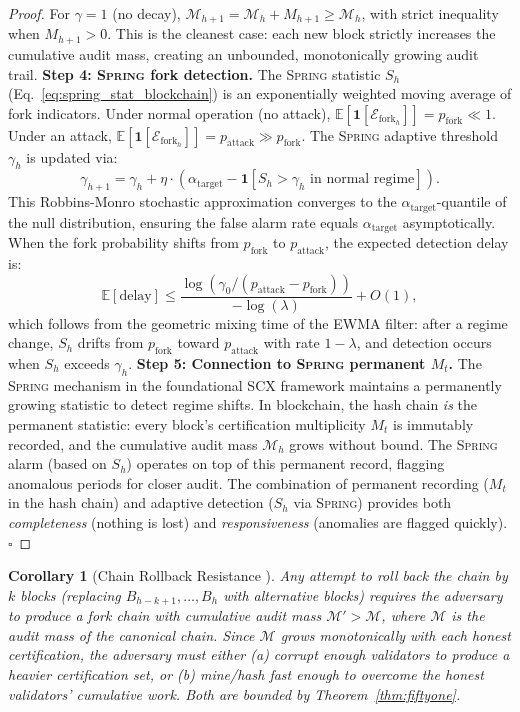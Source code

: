 \documentclass[11pt,a4paper]{article}
\newtheorem{corollary}[theorem]{Corollary}
\theoremstyle{definition}
\newcommand{\Spring}{\textsc{Spring}}
\newcommand{\SCX}{\textsc{SCX}}
\newcommand{\E}{\mathbb{E}}
\newcommand{\ind}[1]{\mathbf{1}[#1]}
\newcommand{\forkEvent}{\mathcal{E}_{\mathrm{fork}}}
\begin{document}
\begin{proof}
For $\gamma = 1$ (no decay), $\mathcal{M}_{h+1} = \mathcal{M}_h + M_{h+1} \geq \mathcal{M}_h$, with strict inequality when $M_{h+1} > 0$. This is the cleanest case: each new block strictly increases the cumulative audit mass, creating an unbounded, monotonically growing audit trail.
\textbf{Step 4: \Spring{} fork detection.} The \Spring{} statistic $S_h$ (Eq.~\ref{eq:spring_stat_blockchain}) is an exponentially weighted moving average of fork indicators. Under normal operation (no attack), $\E[\ind{\forkEvent_h}] = p_{\mathrm{fork}} \ll 1$. Under an attack, $\E[\ind{\forkEvent_h}] = p_{\mathrm{attack}} \gg p_{\mathrm{fork}}$.
The \Spring{} adaptive threshold $\gamma_h$ is updated via:
\begin{equation}
    \gamma_{h+1} = \gamma_h + \eta \cdot (\alpha_{\mathrm{target}} - \ind{S_h > \gamma_h \text{ in normal regime}}).
    \label{eq:spring_threshold_update}
\end{equation}
This Robbins-Monro stochastic approximation converges to the $\alpha_{\mathrm{target}}$-quantile of the null distribution, ensuring the false alarm rate equals $\alpha_{\mathrm{target}}$ asymptotically.
When the fork probability shifts from $p_{\mathrm{fork}}$ to $p_{\mathrm{attack}}$, the expected detection delay is:
\begin{equation}
    \E[\text{delay}] \leq \frac{\log(\gamma_0 / (p_{\mathrm{attack}} - p_{\mathrm{fork}}))}{-\log(\lambda)} + O(1),
    \label{eq:detection_delay}
\end{equation}
which follows from the geometric mixing time of the EWMA filter: after a regime change, $S_h$ drifts from $p_{\mathrm{fork}}$ toward $p_{\mathrm{attack}}$ with rate $1-\lambda$, and detection occurs when $S_h$ exceeds $\gamma_h$.
\textbf{Step 5: Connection to \Spring{} permanent $M_t$.} The \Spring{} mechanism in the foundational \SCX{} framework maintains a permanently growing statistic to detect regime shifts. In blockchain, the hash chain \textit{is} the permanent statistic: every block's certification multiplicity $M_t$ is immutably recorded, and the cumulative audit mass $\mathcal{M}_h$ grows without bound. The \Spring{} alarm (based on $S_h$) operates on top of this permanent record, flagging anomalous periods for closer audit. The combination of permanent recording ($M_t$ in the hash chain) and adaptive detection ($S_h$ via \Spring{}) provides both \textit{completeness} (nothing is lost) and \textit{responsiveness} (anomalies are flagged quickly). $\square$
\end{proof}
\begin{corollary}[Chain Rollback Resistance ]
\label{cor:rollback_resistance}
Any attempt to roll back the chain by $k$ blocks (replacing $B_{h-k+1}, \ldots, B_h$ with alternative blocks) requires the adversary to produce a fork chain with cumulative audit mass $\mathcal{M}' > \mathcal{M}$, where $\mathcal{M}$ is the audit mass of the canonical chain. Since $\mathcal{M}$ grows monotonically with each honest certification, the adversary must either (a) corrupt enough validators to produce a heavier certification set, or (b) mine/hash fast enough to overcome the honest validators' cumulative work. Both are bounded by Theorem~\ref{thm:fiftyone}.
\end{corollary}
\end{document}
